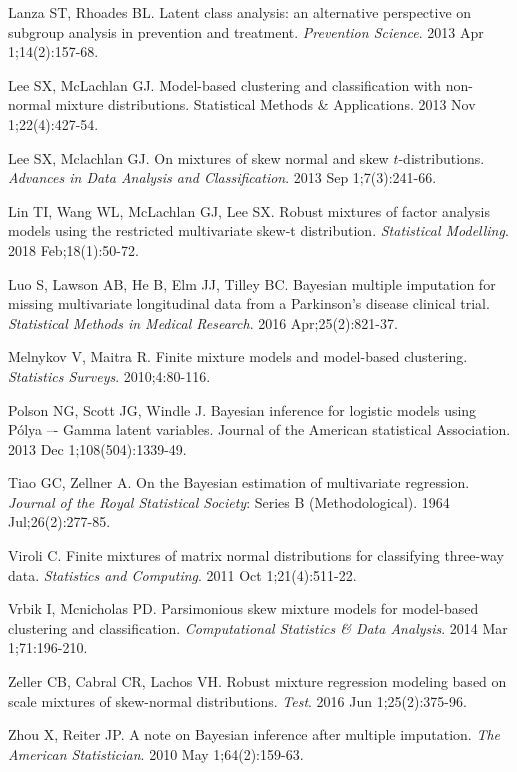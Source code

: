 \documentclass[useAMS,referee]{biom}
\begin{document}
\begin{thebibliography}{}
\bibitem{ } Lanza ST, Rhoades BL. Latent class analysis: an alternative perspective on subgroup analysis in prevention and treatment. \textit{Prevention Science}. 2013 Apr 1;14(2):157-68.

\bibitem{ } Lee SX, McLachlan GJ. Model-based clustering and classification with non-normal mixture distributions. Statistical Methods \& Applications. 2013 Nov 1;22(4):427-54.

\bibitem{ } Lee SX, Mclachlan GJ. On mixtures of skew normal and skew $t$-distributions. \textit{Advances in Data Analysis and Classification}. 2013 Sep 1;7(3):241-66.

\bibitem{ } Lin TI, Wang WL, McLachlan GJ, Lee SX. Robust mixtures of factor analysis models using the restricted multivariate skew-t distribution. \textit{Statistical Modelling}. 2018 Feb;18(1):50-72.

\bibitem{ } Luo S, Lawson AB, He B, Elm JJ, Tilley BC. Bayesian multiple imputation for missing multivariate longitudinal data from a Parkinson's disease clinical trial. \textit{Statistical Methods in Medical Research}. 2016 Apr;25(2):821-37.

\bibitem{ } Melnykov V, Maitra R. Finite mixture models and model-based clustering. \textit{Statistics Surveys}. 2010;4:80-116.

\bibitem{ } Polson NG, Scott JG, Windle J. Bayesian inference for logistic models using P\'olya –- Gamma latent variables. Journal of the American statistical Association. 2013 Dec 1;108(504):1339-49.

\bibitem{ } Tiao GC, Zellner A. On the Bayesian estimation of multivariate regression. \textit{Journal of the Royal Statistical Society}: Series B (Methodological). 1964 Jul;26(2):277-85.

\bibitem{ } Viroli C. Finite mixtures of matrix normal distributions for classifying three-way data. \textit{Statistics and Computing}. 2011 Oct 1;21(4):511-22.

\bibitem{ } Vrbik I, Mcnicholas PD. Parsimonious skew mixture models for model-based clustering and classification. \textit{Computational Statistics \& Data Analysis}. 2014 Mar 1;71:196-210.

\bibitem{ } Zeller CB, Cabral CR, Lachos VH. Robust mixture regression modeling based on scale mixtures of skew-normal distributions. \textit{Test}. 2016 Jun 1;25(2):375-96.

\bibitem{ } Zhou X, Reiter JP. A note on Bayesian inference after multiple imputation. \textit{The American Statistician}. 2010 May 1;64(2):159-63.

\end{thebibliography}




\label{lastpage}
\end{document}
